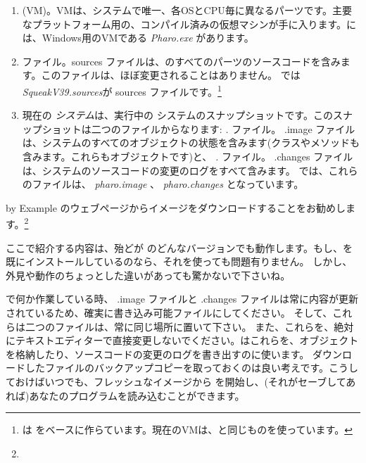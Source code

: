 \documentclass[a4paper,10pt,twoside]{book}
\begin{document}
\begin{enumerate}

  \item {} (VM)。VMは、システムで唯一、各OSとCPU毎に異なるパーツです。主要なプラットフォーム用の、コンパイル済みの仮想マシンが手に入ります。には、Windows用のVMである \textit{Pharo.exe} があります。

  \item {} ファイル。sources ファイルは、\pharo のすべてのパーツのソースコードを含みます。このファイルは、ほぼ変更されることはありません。 では \emph{SqueakV39.sources}が sources ファイルです。\footnote{\pharo は  をベースに作らています。現在のVMは、\squeak と同じものを使っています。}

  \item 現在の \emph{システム}は、実行中の \pharo システムのスナップショットです。このスナップショットは二つのファイルからなります: \emph{.} ファイル。 .image ファイルは、システムのすべてのオブジェクトの状態を含みます(クラスやメソッドも含みます。これらもオブジェクトです)と、 \emph{.} ファイル。 .changes ファイルは、システムのソースコードの変更のログをすべて含みます。
では、これらのファイルは、 \emph{pharo.image} 、 \emph{pharo.changes} となっています。
\end{enumerate}

\pharo by Example のウェブページからイメージをダウンロードすることをお勧めします。\footnote{\pbe}

ここで紹介する内容は、殆どが \pharo のどんなバージョンでも動作します。もし、\pharo を既にインストールしているのなら、それを使っても問題有りません。
しかし、外見や動作のちょっとした違いがあっても驚かないで下さいね。

\pharo で何か作業している時、 .image ファイルと .changes ファイルは常に内容が更新されているため、確実に書き込み可能ファイルにしてください。
そして、これらは二つのファイルは、常に同じ場所に置いて下さい。
また、これらを、絶対にテキストエディターで直接変更しないでください。\pharo はこれらを、オブジェクトを格納したり、ソースコードの変更のログを書き出すのに使います。
ダウンロードしたファイルのバックアップコピーを取っておくのは良い考えです。こうしておけばいつでも、フレッシュなイメージから \pharo を開始し、(それがセーブしてあれば)あなたのプログラムを読み込むことができます。
\end{document}
